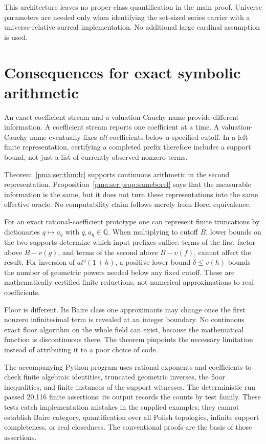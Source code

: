\documentclass[11pt]{article}
\numberwithin{equation}{section}
\theoremstyle{definition}
\theoremstyle{remark}
\newcommand{\Q}{\mathbb Q}
\begin{document}
This architecture leaves no proper-class quantification in the main proof.
Universe parameters are needed only when identifying the set-sized series
carrier with a universe-relative surreal implementation. No additional large
cardinal assumption is used.

\section{Consequences for exact symbolic arithmetic}
\label{pma:ser:sec:computing}

An exact coefficient stream and a valuation-Cauchy name provide different
information. A coefficient stream reports one coefficient at a time. A
valuation-Cauchy name eventually fixes \emph{all} coefficients below a
specified cutoff. In a left-finite representation, certifying a completed
prefix therefore includes a support bound, not just a list of currently
observed nonzero terms.

Theorem~\ref{pma:ser:thm:lc} supports continuous arithmetic in the second
representation. Proposition~\ref{pma:ser:prop:sameborel} says that the measurable
information is the same, but it does not turn these representations into the
same effective oracle. No computability claim follows merely from Borel
equivalence.

For an exact rational-coefficient prototype one can represent finite
truncations by dictionaries $q\mapsto a_q$ with $q,a_q\in\Q$.
When multiplying to cutoff $B$, lower bounds on the two supports determine
which input prefixes suffice: terms of the first factor above $B-v(g)$,
and terms of the second above $B-v(f)$, cannot affect the result. For
inversion of $a t^q(1+h)$, a positive lower bound
$\delta\leq v(h)$ bounds the number of geometric powers needed below any
fixed cutoff. These are mathematically certified finite reductions, not
numerical approximations to real coefficients.

Floor is different. Its Baire class one approximants may change once the
first nonzero infinitesimal term is revealed at an integer boundary. No
continuous exact floor algorithm on the whole field can exist, because the
mathematical function is discontinuous there. The theorem pinpoints the
necessary limitation instead of attributing it to a poor choice of code.

The accompanying Python program uses rational exponents and coefficients to
check finite algebraic identities, truncated geometric inverses, the floor
inequalities, and finite instances of the support witnesses. The deterministic run passed 20,116 finite assertions; its output
records the counts by test family. These tests catch implementation mistakes in
the supplied examples; they cannot establish Baire category, quantification
over all Polish topologies, infinite support completeness, or real closedness.
The conventional proofs are the basis of those assertions.
\end{document}
